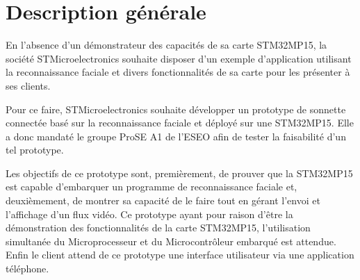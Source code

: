 \newpage
\section{Description générale}

En l'absence d'un démonstrateur des capacités de sa carte STM32MP15, la société STMicroelectronics souhaite disposer d'un exemple d'application utilisant la reconnaissance faciale et divers fonctionnalités de sa carte pour les présenter à ses clients.

Pour ce faire, STMicroelectronics souhaite développer un prototype de sonnette connectée basé sur la reconnaissance faciale et déployé sur une STM32MP15.
Elle a donc mandaté le groupe ProSE A1 de l'ESEO afin de tester la faisabilité d'un tel prototype.

Les objectifs de ce prototype sont, premièrement, de prouver que la STM32MP15 est capable d'embarquer un programme de reconnaissance faciale et, deuxièmement, de montrer sa capacité de le faire tout en gérant l'envoi et l'affichage d'un flux vidéo. 
Ce prototype ayant pour raison d'être la démonstration des fonctionnalités de la carte STM32MP15, l'utilisation simultanée du Microprocesseur et du Microcontrôleur embarqué est attendue.
Enfin le client attend de ce prototype une interface utilisateur via une application téléphone.












